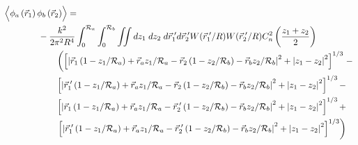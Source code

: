 \begin{equation}\label{eqn:prphase_n3}
\begin{aligned}
& \left\langle \vphantom{\hat{\phi}_{a}} \phi_{a}\left(\vec{r}_{1}\right) \phi_{b}\left(\vec{r}_{2}\right)\right\rangle = \\
&\quad\quad\quad\quad
-\frac{k^{2}}{2\pi^{2}R^{4}} \int_{0}^{\mathcal{R}_{a}}  \int_{0}^{\mathcal{R}_{b}} \iint dz_{1} \; dz_{2} \; d\vec{r}^{\;\prime}_{1}d\vec{r}^{\;\prime}_{2}  
W(\vec{r}^{\;\prime}_{1}/R) W(\vec{r}^{\;\prime}_{2}/R) C_{n}^{2}\left(\frac{z_{1} + z_{2}}{2}\right) \\
&\quad\quad\quad\quad\quad\quad
\left(
\left[ \left\vert \vec{r}_{1}\left(1-z_{1}/\mathcal{R}_{a}\right) + \vec{r}_{a} z_{1}/\mathcal{R}_{a} - 
\vec{r}_{2}\left(1-z_{2}/\mathcal{R}_{b}\right) - \vec{r}_{b} z_{2}/\mathcal{R}_{b}\right\vert^{2} + 
\left\vert z_{1} - z_{2} \right\vert^{2}\right]^{1/3}
\right. -\\
& \quad\quad\quad\quad\quad\quad
\left[ \left\vert \vec{r}^{\;\prime}_{1}\left(1-z_{1}/\mathcal{R}_{a}\right) + \vec{r}_{a} z_{1}/\mathcal{R}_{a} - 
\vec{r}_{2}\left(1-z_{2}/\mathcal{R}_{b}\right) - \vec{r}_{b} z_{2}/\mathcal{R}_{b}\right\vert^{2} + 
\left\vert z_{1} - z_{2} \right\vert^{2}\right]^{1/3} - \\
& \quad\quad\quad\quad\quad\quad
\left[ \left\vert \vec{r}_{1}\left(1-z_{1}/\mathcal{R}_{a}\right) + \vec{r}_{a} z_{1}/\mathcal{R}_{a} - 
\vec{r}^{\;\prime}_{2}\left(1-z_{2}/\mathcal{R}_{b}\right) - \vec{r}_{b} z_{2}/\mathcal{R}_{b}\right\vert^{2} + 
\left\vert z_{1} - z_{2} \right\vert^{2}\right]^{1/3} + \\
& \quad\quad\quad\quad\quad\quad
\left.
\left[ \left\vert \vec{r}^{\;\prime}_{1}\left(1-z_{1}/\mathcal{R}_{a}\right) + \vec{r}_{a} z_{1}/\mathcal{R}_{a} - 
\vec{r}^{\;\prime}_{2}\left(1-z_{2}/\mathcal{R}_{b}\right) - \vec{r}_{b} z_{2}/\mathcal{R}_{b}\right\vert^{2} + 
\left\vert z_{1} - z_{2} \right\vert^{2}\right]^{1/3}\right)
\end{aligned}
\end{equation}

